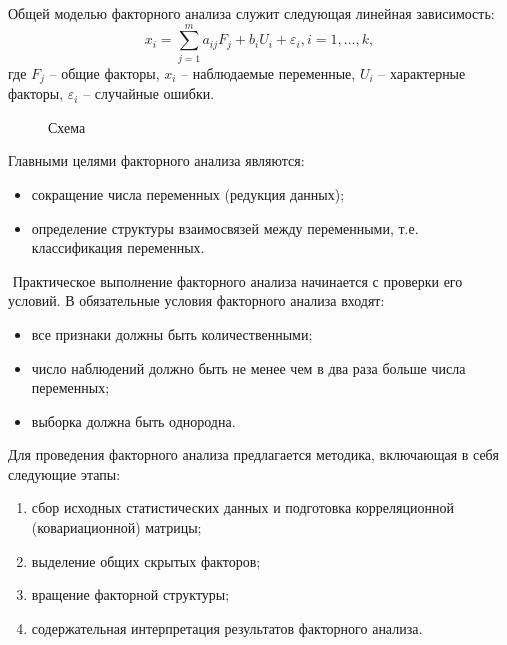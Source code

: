 \documentclass[a4paper, 12pt]{article}
\begin{document}
Общей моделью факторного анализа служит следующая линейная зависимость:
\begin{equation}
    x_i = \sum_{j=1}^m a_{i j} F_j+ b_i U_i + \varepsilon_i, i = 1, \dots, k,
\end{equation}
где $F_j$ -- общие факторы, $x_i$ -- наблюдаемые переменные, $U_i$ -- характерные факторы, $ \varepsilon_i$ -- случайные ошибки.

\begin{figure}[h!]
    \caption{Схема}
    \label{ris:image}
    \end{figure}

Главными целями факторного анализа являются:
\begin{itemize}
    \item сокращение числа переменных (редукция данных);
    \item определение структуры взаимосвязей между переменными, т.е. классификация переменных.
\end{itemize}
­	
­Практическое выполнение факторного анализа начинается с проверки его условий. В обязательные условия факторного анализа входят:
\begin{itemize}
    \item все признаки должны быть количественными;
    \item число наблюдений должно быть не менее чем в два раза больше числа переменных;
    \item выборка должна быть однородна.
\end{itemize}

Для проведения факторного анализа предлагается методика, включающая в себя следующие этапы:
\begin{enumerate}
    \item сбор исходных статистических данных и подготовка корреляционной (ковариационной) матрицы;
    \item выделение общих скрытых факторов;
    \item вращение факторной структуры;
    \item содержательная интерпретация результатов факторного анализа.
\end{enumerate}
\end{document}

